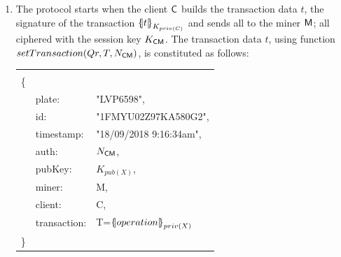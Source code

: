 \begin{enumerate}
    \item The protocol starts when the client $\textsf{C}$ builds the transaction 
        data $t$, the signature of the transaction $\fat{t}_{K_{priv(C)}}$ and sends
        all to the miner $\textsf{M}$; all ciphered with the 
        session key $K_{\textsf{C}\textsf{M}}$.
        The transaction data $t$, using function $setTransaction(Qr,T,N_{\textsf{C}\textsf{M}})$, 
        is constituted as follows:
        
        \begin{tabular}{lll}
                &               & \\ 
            \{  &               &    \\
                & plate:        & "LVP6598", \\
                & id:           & "1FMYU02Z97KA580G2", \\
                & timestamp:    & "18/09/2018 9:16:34am", \\
                & auth:         & $N_{\textsf{C}\textsf{M}}$, \\
                & pubKey:       & $K_{pub(X)}$, \\
                & miner:        & M, \\
                & client:       & C, \\
                & transaction:  & T=$\fat{operation}_{priv(X)}$ \\
            \}  &               &   \\
        \end{tabular}
        

\end{enumerate}
